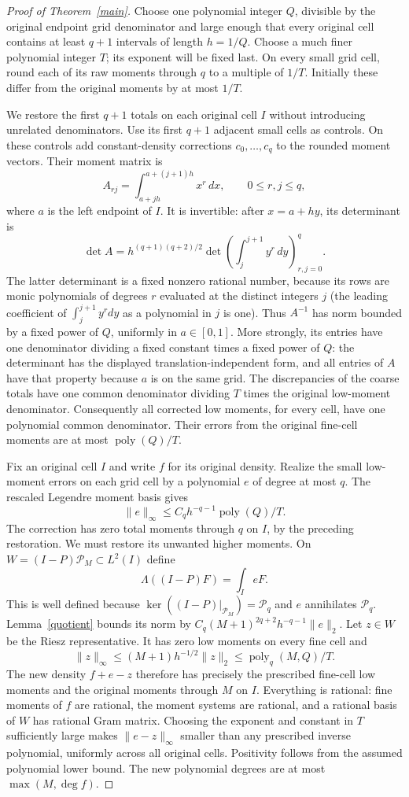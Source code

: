 \documentclass[11pt]{article}
\newcommand{\PP}{\mathcal P}
\begin{document}
\begin{proof}[Proof of Theorem~\ref{main}]
Choose one polynomial integer $Q$, divisible by the original endpoint
grid denominator and large enough that every original cell contains
at least $q+1$ intervals of length $h=1/Q$.
Choose a much finer polynomial integer $T$; its exponent will be fixed
last. On every small grid cell, round each of its raw moments through
$q$ to a multiple of $1/T$. Initially these differ from the original
moments by at most $1/T$.

We restore the first $q+1$ totals on each original cell $I$ without
introducing unrelated denominators. Use its first $q+1$ adjacent small
cells as controls. On these controls add constant-density corrections
$c_0,\ldots,c_q$ to the rounded moment vectors. Their moment matrix is
\[
 A_{rj}=\int_{a+jh}^{a+(j+1)h}x^r\,dx,
       \qquad 0\le r,j\le q,
\]
where $a$ is the left endpoint of $I$.
It is invertible: after $x=a+hy$, its determinant is
\[
 \det A=h^{(q+1)(q+2)/2}
       \det\left(\int_j^{j+1}y^r\,dy\right)_{r,j=0}^q.
\]
The latter determinant is a fixed nonzero rational number, because its
rows are monic polynomials of degrees $r$ evaluated at the distinct
integers $j$ (the leading coefficient of $\int_j^{j+1}y^rdy$ as a
polynomial in $j$ is one).
Thus $A^{-1}$ has norm bounded by a fixed power of $Q$, uniformly in
$a\in[0,1]$. More strongly, its entries have one denominator dividing
a fixed constant times a fixed power of $Q$: the determinant has the
displayed translation-independent form, and all entries of $A$ have
that property because $a$ is on the same grid.
The discrepancies of the coarse totals have one common denominator
dividing $T$ times the original low-moment denominator. Consequently
all corrected low moments, for every cell, have one polynomial common
denominator. Their errors from the original fine-cell moments are at
most $\operatorname{poly}(Q)/T$.

Fix an original cell $I$ and write $f$ for its original density.
Realize the small low-moment errors on each grid cell by a polynomial
$e$ of degree at most $q$. The rescaled Legendre moment basis gives
\[
 \|e\|_\infty\le C_q h^{-q-1}\operatorname{poly}(Q)/T.
\]
The correction has zero total moments through $q$ on $I$, by the
preceding restoration. We must restore its unwanted higher moments.
On $W=(I-P)\PP_M\subset L^2(I)$ define
\[
 \Lambda((I-P)F)=\int_I eF.
\]
This is well defined because $\ker((I-P)|_{\PP_M})=\PP_q$ and
$e$ annihilates $\PP_q$. Lemma~\ref{quotient} bounds its norm by
$C_q(M+1)^{2q+2}h^{-q-1}\|e\|_2$.
Let $z\in W$ be the Riesz representative. It has zero low moments
on every fine cell and
\[
 \|z\|_\infty
 \le (M+1)h^{-1/2}\|z\|_2
 \le \operatorname{poly}_q(M,Q)/T.
\]
The new density $f+e-z$ therefore has precisely the prescribed fine-cell
low moments and the original moments through $M$ on $I$.
Everything is rational: fine moments of $f$ are rational, the moment
systems are rational, and a rational basis of $W$ has rational Gram
matrix. Choosing the exponent and constant in $T$ sufficiently large
makes $\|e-z\|_\infty$ smaller than any prescribed inverse polynomial,
uniformly across all original cells. Positivity follows from the
assumed polynomial lower bound. The new polynomial degrees are at most
$\max(M,\deg f)$.


\end{proof}
\end{document}
